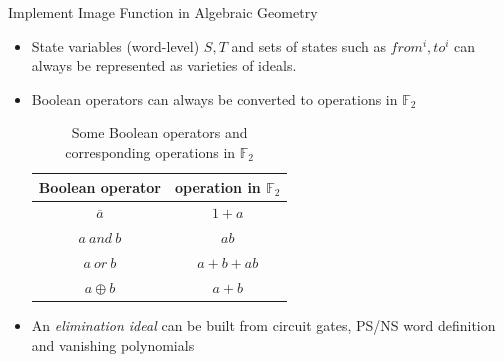 \documentclass[xcolor=dvipsnames]{beamer}
\begin{document}

\begin{frame}{\large{Implement Image Function in Algebraic Geometry}}
\begin{itemize}
\item State variables (word-level) $S, T$ and sets of states such as
$from^i, to^i$ can always be represented as varieties of ideals.
\item Boolean operators can always be converted to operations in $\mathbb F_2$
\begin{table}
\centering
\begin{tabular}{|c|c|} \hline
Boolean operator & operation in $\mathbb{F}_{2}$\\ \hline
$\overline{a}$ & $1 + a$\\ \hline
$a\ and\ b$ & $ab$\\ \hline
$a\ or\ b$ & $a + b + ab$\\ \hline
$a \oplus b$ & $a + b$\\
\hline\end{tabular}
\caption{Some Boolean operators and corresponding operations in $\mathbb{F}_{2}$}
\label{table:booltogalois_op}
\end{table}
\item An \emph{elimination ideal} can be built from circuit gates, PS/NS
word definition and vanishing polynomials
\end{itemize}
\end{frame}
\end{document}
